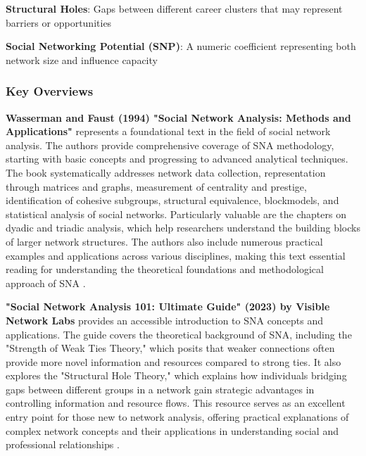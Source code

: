 \documentclass[../main.tex]{subfiles}
\begin{document}
\textbf{Structural Holes}: Gaps between different career clusters that may represent barriers or opportunities \citep{visible_network_labs}

\textbf{Social Networking Potential (SNP)}: A numeric coefficient representing both network size and influence capacity \citep{wikipedia_sna}

\subsubsection{Key Overviews}

\textbf{Wasserman and Faust (1994) "Social Network Analysis: Methods and Applications"} represents a foundational text in the field of social network analysis. The authors provide comprehensive coverage of SNA methodology, starting with basic concepts and progressing to advanced analytical techniques. The book systematically addresses network data collection, representation through matrices and graphs, measurement of centrality and prestige, identification of cohesive subgroups, structural equivalence, blockmodels, and statistical analysis of social networks. Particularly valuable are the chapters on dyadic and triadic analysis, which help researchers understand the building blocks of larger network structures. The authors also include numerous practical examples and applications across various disciplines, making this text essential reading for understanding the theoretical foundations and methodological approach of SNA \citep{wasserman_faust_archive, butts_methodological_2008}.

\textbf{"Social Network Analysis 101: Ultimate Guide" (2023) by Visible Network Labs} provides an accessible introduction to SNA concepts and applications. The guide covers the theoretical background of SNA, including the "Strength of Weak Ties Theory," which posits that weaker connections often provide more novel information and resources compared to strong ties. It also explores the "Structural Hole Theory," which explains how individuals bridging gaps between different groups in a network gain strategic advantages in controlling information and resource flows. This resource serves as an excellent entry point for those new to network analysis, offering practical explanations of complex network concepts and their applications in understanding social and professional relationships \citep{visible_network_labs}.
\end{document}
